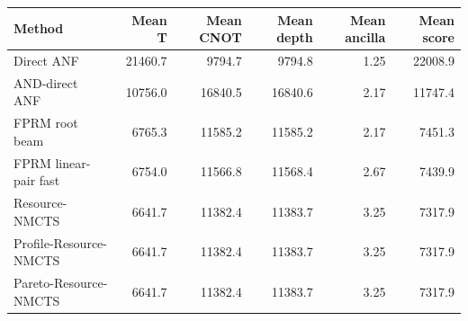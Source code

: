\begin{tabular}{lrrrrr}
\toprule
Method & Mean T & Mean CNOT & Mean depth & Mean ancilla & Mean score \\
\midrule
Direct ANF & 21460.7 & 9794.7 & 9794.8 & 1.25 & 22008.9 \\
AND-direct ANF & 10756.0 & 16840.5 & 16840.6 & 2.17 & 11747.4 \\
FPRM root beam & 6765.3 & 11585.2 & 11585.2 & 2.17 & 7451.3 \\
FPRM linear-pair fast & 6754.0 & 11566.8 & 11568.4 & 2.67 & 7439.9 \\
Resource-NMCTS & 6641.7 & 11382.4 & 11383.7 & 3.25 & 7317.9 \\
Profile-Resource-NMCTS & 6641.7 & 11382.4 & 11383.7 & 3.25 & 7317.9 \\
Pareto-Resource-NMCTS & 6641.7 & 11382.4 & 11383.7 & 3.25 & 7317.9 \\
\bottomrule
\end{tabular}

